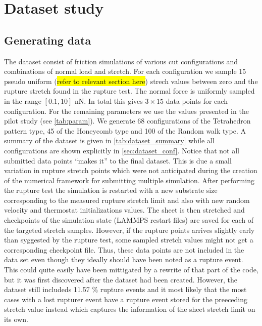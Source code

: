\chapter{Dataset study}

\section{Generating data}
The dataset consist of friction simulations of various cut configurations and combinations of normal load and stretch. For each configuration we
sample 15 pseudo uniform (\hl{refer to relevant section here}) strech values
between zero and the rupture stretch found in the rupture test. The normal force
is uniformly sampled in the range $[0.1, 10]$ nN. In total this gives $3\times
15$ data points for each configuration. For the remaining parameters we use the
values presented in the pilot study (see \cref{tab:param}). We generate 68
configurations of the Tetrahedron pattern type, 45 of the Honeycomb type and 100
of the Random walk type. A summary of the dataset is given in \cref{tab:dataset_summary} while all configurations are shown explicitly in \cref{sec:dataset_conf}. Notice that not all submitted data points ``makes it'' to the final dataset. This is due a small variation in rupture stretch points which were not anticipated during the creation of the numerical framework for submitting multiple simulation. After performing the rupture test the simulation is restarted
with a new substrate size corresponding to the measured rupture stretch limit
and also with new random velocity and thermostat initializations values. The sheet is then stretched and checkpoints of the simulation state (LAMMPS restart files) are saved for each of the targeted stretch samples. However, if the rupture points arrives slightly early than syggested by the rupture test, some sampled stretch values might not get a corresponding checkpoint file. Thus, these data points are not included in the data set even though they ideally should have been noted as a rupture event. This could quite easily have been mittigated by a rewrite of that part of the code, but it was first discovered after the dataset had been created. However, the dataset still includeds 11.57 \% rupture events and it most likely that the most cases with a lost rupturer event have a rupture event stored for the preeceding stretch value instead which captures the information of the sheet stretch limit on its own. 

